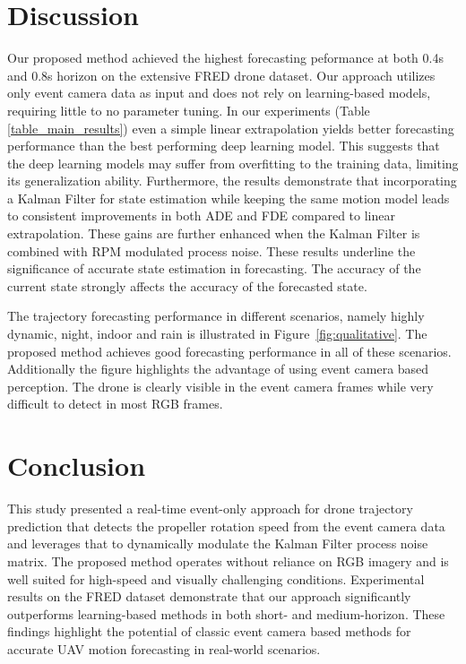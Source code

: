 \documentclass[letterpaper, 10 pt, conference]{ieeeconf}  %
\begin{document}
\section{Discussion}\label{sec:disscussion}

Our proposed method achieved the highest forecasting peformance at both 0.4s and 0.8s horizon on the extensive FRED drone dataset.  
Our approach utilizes only event camera data as input and does not rely on learning-based models, requiring little to no parameter tuning. 
In our experiments (Table \ref{table_main_results}) even a simple linear extrapolation yields better forecasting performance than the best performing deep learning model. This suggests that the deep learning models may suffer from overfitting to the training data, limiting its generalization ability. Furthermore, the results demonstrate that incorporating a Kalman Filter for state estimation while keeping the same motion model leads to consistent improvements in both ADE and FDE compared to linear extrapolation. These gains are further enhanced when the Kalman Filter is combined with RPM modulated process noise. These results underline the significance of accurate state estimation in forecasting. The accuracy of the current state strongly affects the accuracy of the forecasted state.  

The trajectory forecasting performance in different scenarios, namely highly dynamic, night, indoor and rain is illustrated in Figure~\ref{fig:qualitative}.
The proposed method achieves good forecasting performance in all of these scenarios. Additionally the figure highlights the advantage of using event camera based perception. The drone is clearly visible in the event camera frames while very difficult to detect in most RGB frames.    

\section{Conclusion}\label{sec:conclusion}
This study presented a real-time event-only approach for drone trajectory prediction that detects the propeller rotation speed from the event camera data and leverages that to dynamically modulate the Kalman Filter process noise matrix. The proposed method operates without reliance on RGB imagery and is well suited for high-speed and visually challenging conditions. Experimental results on the FRED dataset demonstrate that our approach significantly outperforms learning-based methods in both short- and medium-horizon. These findings highlight the potential of classic event camera based methods for accurate UAV motion forecasting in real-world scenarios.
\end{document}
